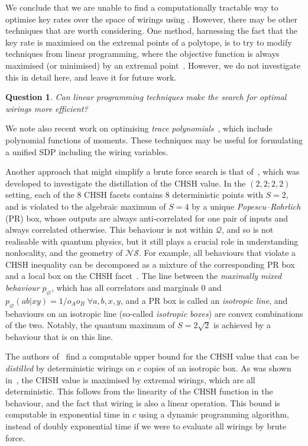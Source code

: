 \documentclass[10pt, a4paper]{article}
\numberwithin{equation}{section} %
\theoremstyle{definition}
\theoremstyle{plain}
\newtheorem{question}{Question}
\newcommand{\?}{\mathrel{?}} %
\newcommand{\Qs}{\mathcal{Q}}
\newcommand{\NSs}{\mathcal{NS}}
\begin{document}
                        We conclude that we are unable to find a computationally tractable way to optimise key rates over the space of wirings using . However, there may be other techniques that are worth considering. One method, harnessing the fact that the key rate is maximised on the extremal points of a polytope, is to try to modify techniques from linear programming, where the objective function is always maximised (or minimised) by an extremal point~\cite{LuenbergerYe}. However, we do not investigate this in detail here, and leave it for future work.
                        \begin{question}
                          Can linear programming techniques make the search for optimal wirings more efficient?
                        \end{question}
                        We note also recent work on optimising \emph{trace polynomials}~\cite{TracePolyOpt}, which include polynomial functions of moments. These techniques may be useful for formulating a unified SDP including the wiring variables.

                        Another approach that might simplify a brute force search is that of~\cite{DistillationBounds}, which was developed to investigate the distillation of the CHSH value. In the \((2,2;2,2)\) setting, each of the 8 CHSH facets contains 8 deterministic points with \(S = 2\), and is violated to the algebraic maximum of \(S = 4\) by a unique \emph{Popescu–Rohrlich} (PR) box, whose outputs are always anti-correlated for one pair of inputs and always correlated otherwise. This behaviour is not within \(\Qs\), and so is not realisable with quantum physics, but it still plays a crucial role in understanding nonlocality, and the geometry of \(\NSs\). For example, all behaviours that violate a CHSH inequality can be decomposed as a mixture of the corresponding PR box and a local box on the CHSH facet~\cite{GeomDecomp}. The line between the \emph{maximally mixed behaviour} \(p_{\varnothing}\), which has all correlators and marginals 0 and \(p_{\varnothing}(ab|xy) = 1/o_A o_B\; \forall a,b,x,y\), and a PR box is called an \emph{isotropic line}, and behaviours on an isotropic line (so-called \emph{isotropic boxes}) are convex combinations of the two. Notably, the quantum maximum of \(S = 2\sqrt{2}\) is achieved by a behaviour that is on this line.

                        The authors of~\cite{DistillationBounds} find a computable upper bound for the CHSH value that can be \emph{distilled} by deterministic wirings on \(c\) copies of an isotropic box. As was shown in~\cite{JanLiThesis}, the CHSH value is maximised by extremal wirings, which are all deterministic. This follows from the linearity of the CHSH function in the behaviour, and the fact that wiring is also a linear operation. This bound is computable in exponential time in \(c\) using a dynamic programming algorithm, instead of doubly exponential time if we were to evaluate all wirings by brute force.
\end{document}
